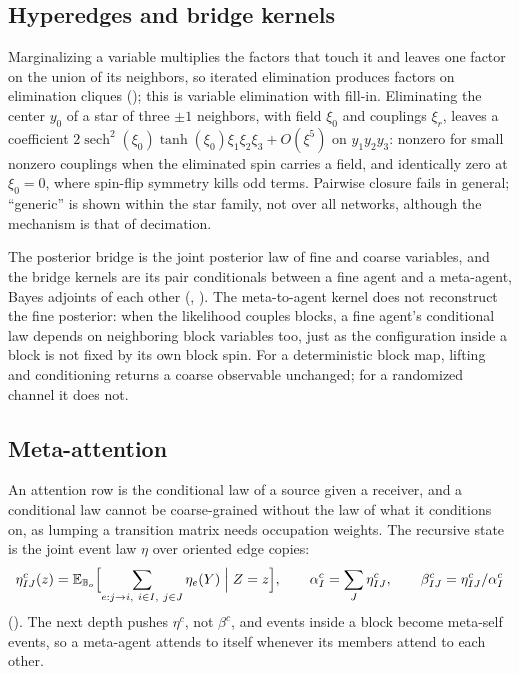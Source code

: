\subsection{Hyperedges and bridge kernels}

Marginalizing a variable multiplies the factors that touch it and leaves one factor on the union of its
neighbors, so iterated elimination produces factors on elimination cliques
(); this is variable elimination with fill-in. Eliminating the center
$y_0$ of a star of three $\pm1$ neighbors, with field $\xi_0$ and couplings $\xi_r$, leaves a
coefficient $2\operatorname{sech}^2(\xi_0)\tanh(\xi_0)\xi_1\xi_2\xi_3+O(\xi^5)$ on $y_1y_2y_3$: nonzero
for small nonzero couplings when the eliminated spin carries a field, and identically zero at
$\xi_0=0$, where spin-flip symmetry kills odd terms. Pairwise closure fails in general; ``generic'' is
shown within the star family, not over all networks, although the mechanism is that of decimation.

The posterior bridge is the joint posterior law of fine and coarse variables, and the bridge kernels
are its pair conditionals between a fine agent and a meta-agent, Bayes adjoints of each other
(, ). The meta-to-agent kernel does not
reconstruct the fine posterior: when the likelihood couples blocks, a fine agent's conditional law
depends on neighboring block variables too, just as the configuration inside a block is not fixed by
its own block spin. For a deterministic block map, lifting and conditioning returns a coarse observable
unchanged; for a randomized channel it does not.

\subsection{Meta-attention}

An attention row is the conditional law of a source given a receiver, and a conditional law cannot be
coarse-grained without the law of what it conditions on, as lumping a transition matrix needs
occupation weights. The recursive state is the joint event law $\eta$ over oriented edge copies:
\[
\eta^c_{IJ}(z)=\mathbb E_{\mathbb B_o}\Bigl[\sum_{e:j\to i,\ i\in I,\ j\in J}\eta_e(Y)\Bigm|Z=z\Bigr],
\qquad
\alpha^c_I=\sum_J\eta^c_{IJ},
\qquad
\beta^c_{IJ}=\eta^c_{IJ}/\alpha^c_I
\]
(). The next depth pushes $\eta^c$, not $\beta^c$, and events
inside a block become meta-self events, so a meta-agent attends to itself whenever its members attend
to each other.

